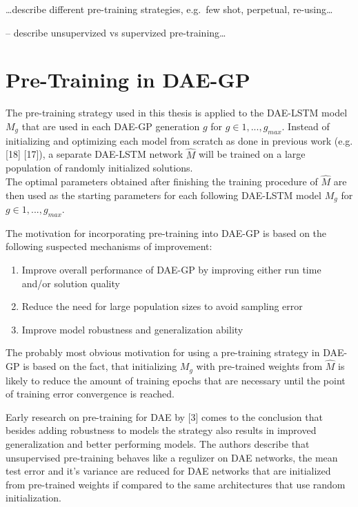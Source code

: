\documentclass[
  11pt,
]{article}
\providecommand{\tightlist}{%
  \setlength{\itemsep}{0pt}\setlength{\parskip}{0pt}}
\begin{document}
\ldots describe different pre-training strategies, e.g.~few shot,
perpetual, re-using\ldots{}

-- describe unsupervized vs supervized pre-training\ldots{}

\hypertarget{pre-training-in-dae-gp}{%
\section{Pre-Training in DAE-GP}\label{pre-training-in-dae-gp}}

The pre-training strategy used in this thesis is applied to the DAE-LSTM
model \(M_g\) that are used in each DAE-GP generation \(g\) for
\(g\in{1,...,g_{max}}\). Instead of initializing and optimizing each
model from scratch as done in previous work (e.g. {[}18{]} {[}17{]}), a
separate DAE-LSTM network \(\hat{M}\) will be trained on a large
population of randomly initialized solutions.\\
The optimal parameters obtained after finishing the training procedure
of \(\hat{M}\) are then used as the starting parameters for each
following DAE-LSTM model \(M_g\) for \(g\in{1,...,g_{max}}\).

The motivation for incorporating pre-training into DAE-GP is based on
the following suspected mechanisms of improvement:

\begin{enumerate}
\def\labelenumi{\arabic{enumi}.}
\tightlist
\item
  Improve overall performance of DAE-GP by improving either run time
  and/or solution quality
\item
  Reduce the need for large population sizes to avoid sampling error
\item
  Improve model robustness and generalization ability
\end{enumerate}

The probably most obvious motivation for using a pre-training strategy
in DAE-GP is based on the fact, that initializing \(M_g\) with
pre-trained weights from \(\hat{M}\) is likely to reduce the amount of
training epochs that are necessary until the point of training error
convergence is reached.

Early research on pre-training for DAE by {[}3{]} comes to the
conclusion that besides adding robustness to models the strategy also
results in improved generalization and better performing models. The
authors describe that unsupervised pre-training behaves like a regulizer
on DAE networks, the mean test error and it's variance are reduced for
DAE networks that are initialized from pre-trained weights if compared
to the same architectures that use random initialization.
\end{document}
